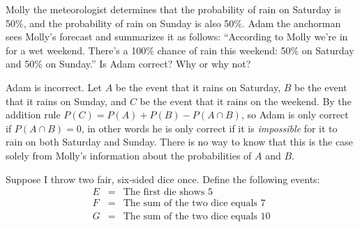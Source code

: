 \documentclass[addpoints,12pt]{exam}
\begin{document}
\begin{questions}
\question Molly the meteorologist determines that the probability of rain on Saturday is 50\%, and the probability of rain on Sunday is also 50\%.
Adam the anchorman sees Molly's forecast and summarizes it as follows:  ``According to Molly we're in for a wet weekend. There's a 100\% chance of rain this weekend: 50\% on Saturday and 50\% on Sunday.'' Is Adam correct? Why or why not? 
			\begin{solution}
				Adam is incorrect. 
        Let $A$ be the event that it rains on Saturday, $B$ be the event that it rains on Sunday, and $C$ be the event that it rains on the weekend.
        By the addition rule $P(C) = P(A) + P(B) - P(A\cap B)$, so Adam is only correct if $P(A\cap B) = 0$, in other words he is only correct if it is \emph{impossible} for it to rain on both Saturday and Sunday. There is no way to know that this is the case solely from Molly's information about the probabilities of $A$ and $B$.
			\end{solution}


\question Suppose I throw two fair, six-sided dice once. Define the following events:
	\begin{eqnarray*}
		E &=& \mbox{The first die shows 5}\\
		F &=& \mbox{The sum of the two dice equals 7}\\
		G &=& \mbox{The sum of the two dice equals 10}
	\end{eqnarray*}
\end{questions}
\end{document}
